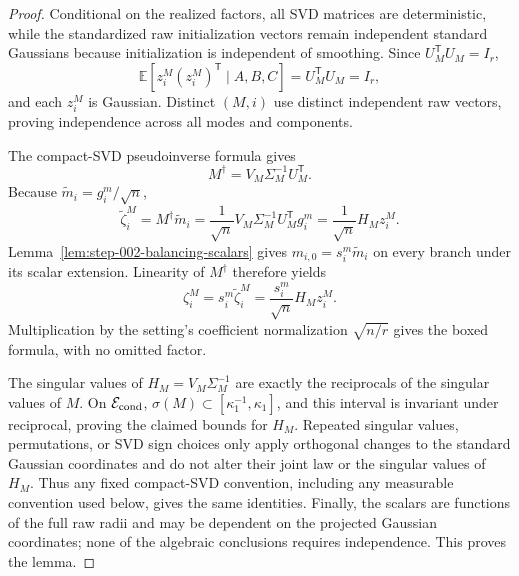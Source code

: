 \begin{proof}
Conditional on the realized factors, all SVD
matrices are deterministic, while the standardized raw initialization vectors
remain independent standard Gaussians because initialization is independent
of smoothing. Since \(U_M^{\mathsf T}U_M=I_r\),
\[
  \mathbb E[z_i^M(z_i^M)^{\mathsf T}\mid A,B,C]
  =U_M^{\mathsf T}U_M=I_r,
\]
and each \(z_i^M\) is Gaussian. Distinct \((M,i)\) use distinct independent
raw vectors, proving independence across all modes and components.

The compact-SVD pseudoinverse formula gives
\[
  M^\dagger=V_M\Sigma_M^{-1}U_M^{\mathsf T}.
\]
Because \(\widetilde m_i=g_i^m/\sqrt n\),
\[
  \widetilde\zeta_i^M
  =M^\dagger\widetilde m_i
  =\frac1{\sqrt n}V_M\Sigma_M^{-1}U_M^{\mathsf T}g_i^m
  =\frac1{\sqrt n}H_Mz_i^M.                 \tag{1}
\]
Lemma~\ref{lem:step-002-balancing-scalars} gives
\(m_{i,0}=s_i^m\widetilde m_i\) on every branch under its scalar extension.
Linearity of \(M^\dagger\) therefore yields
\[
  \zeta_i^M=s_i^m\widetilde\zeta_i^M
  =\frac{s_i^m}{\sqrt n}H_Mz_i^M.           \tag{2}
\]
Multiplication by the setting's coefficient normalization
\(\sqrt{n/r}\) gives the boxed formula, with no omitted factor.

The singular values of \(H_M=V_M\Sigma_M^{-1}\) are exactly the reciprocals
of the singular values of \(M\). On \(\mathcal E_{\rm cond}\),
\(\sigma(M)\subset[\kappa_1^{-1},\kappa_1]\), and this interval is invariant
under reciprocal, proving the claimed bounds for \(H_M\). Repeated singular
values, permutations, or SVD sign choices only apply orthogonal changes to
the standard Gaussian coordinates and do not alter their joint law or the
singular values of \(H_M\). Thus any fixed compact-SVD convention, including
any measurable convention used below, gives the same identities. Finally, the
scalars are functions of the full raw radii and may be dependent on the
projected Gaussian coordinates; none of the algebraic conclusions requires
independence. This proves the lemma.

\end{proof}


